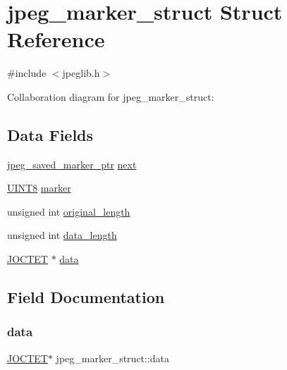 \hypertarget{structjpeg__marker__struct}{}\section{jpeg\+\_\+marker\+\_\+struct Struct Reference}
\label{structjpeg__marker__struct}


{\ttfamily \#include $<$jpeglib.\+h$>$}



Collaboration diagram for jpeg\+\_\+marker\+\_\+struct\+:
\subsection*{Data Fields}
\begin{DoxyCompactItemize}
\item 
\hyperlink{jpeglib_8h_ac2ae4ad9de8160dae89a5af3e8bc7e97}{jpeg\+\_\+saved\+\_\+marker\+\_\+ptr} \hyperlink{structjpeg__marker__struct_a1cb619806ea91b42a46b2a04fafabd82}{next}
\item 
\hyperlink{jmorecfg_8h_adfb9a8ea1dd59f151065f763e1e9acd6}{U\+I\+N\+T8} \hyperlink{structjpeg__marker__struct_a154cf70fc9b4f86da631ca08a12a8d33}{marker}
\item 
unsigned int \hyperlink{structjpeg__marker__struct_a3b17d58a17fa6be8560b697da814dfd3}{original\+\_\+length}
\item 
unsigned int \hyperlink{structjpeg__marker__struct_a98412e9bccde6954ce55f611ad146a6b}{data\+\_\+length}
\item 
\hyperlink{jmorecfg_8h_a356ad249f20e691b520da439f92cccbc}{J\+O\+C\+T\+ET} $\ast$ \hyperlink{structjpeg__marker__struct_a1939bfad4b35034afa8da6d94b61a043}{data}
\end{DoxyCompactItemize}


\subsection{Field Documentation}
\mbox{\label{structjpeg__marker__struct_a1939bfad4b35034afa8da6d94b61a043}} 
\subsubsection{\texorpdfstring{data}{data}}
{\footnotesize\ttfamily \hyperlink{jmorecfg_8h_a356ad249f20e691b520da439f92cccbc}{J\+O\+C\+T\+ET}$\ast$ jpeg\+\_\+marker\+\_\+struct\+::data}

